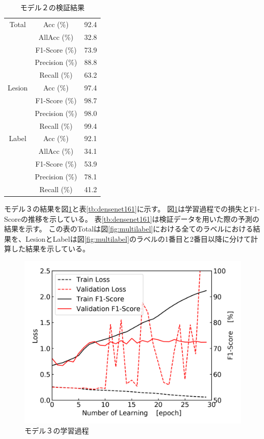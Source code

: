 \begin{table}[tb]
    \caption[]{モデル２の検証結果}
    \label{tb:densenet121_e}
    \centering
    \normalsize
    \begin{tabular}{c|c|r} \hline
        Total & Acc (\%) & 92.4 \\ \cline{2-3}
         & AllAcc (\%) & 32.8 \\ \cline{2-3}
         & F1-Score (\%) & 73.9 \\ \cline{2-3}
         & Precision (\%) & 88.8 \\ \cline{2-3}
         & Recall (\%) & 63.2 \\ \hline
        Lesion & Acc (\%) & 97.4 \\ \cline{2-3}
         & F1-Score (\%) & 98.7 \\ \cline{2-3}
         & Precision (\%) & 98.0 \\ \cline{2-3}
         & Recall (\%) & 99.4 \\ \hline
        Label & Acc (\%) & 92.1 \\ \cline{2-3}
         & AllAcc (\%) & 34.1 \\ \cline{2-3}
         & F1-Score (\%) & 53.9 \\ \cline{2-3}
         & Precision (\%) & 78.1 \\ \cline{2-3}
         & Recall (\%) & 41.2 \\ \hline
    \end{tabular}
\end{table}

\newpage
モデル３の結果を図\ref{fig:densenet161_result_process}と表\ref{tb:densenet161}に示す。
図\ref{fig:densenet161_result_process}は学習過程での損失とF1-Scoreの推移を示している。
表\ref{tb:densenet161}は検証データを用いた際の予測の結果を示す。
この表のTotalは図\ref{fig:multilabel}における全てのラベルにおける結果を、LesionとLabelは図\ref{fig:multilabel}のラベルの1番目と2番目以降に分けて計算した結果を示している。

\begin{figure}[htbp]
    \begin{center}
        \includegraphics[width=150mm]{./fig/densenet161process.png}
        \caption{モデル３の学習過程}
        \label{fig:densenet161_result_process}
    \end{center}
\end{figure}

